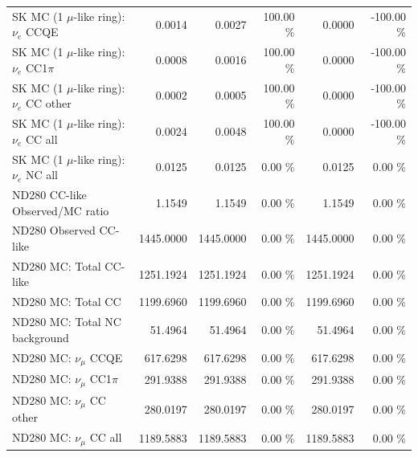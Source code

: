 \begin{table}
\begin{tabular}{| l | r | r  r | r  r |}
                             SK MC (1 $\mu$-like ring): $\nu_{e}$ CCQE &          0.0014 &          0.0027 & 100.00 \%  &          0.0000 & -100.00 \%  \\ 
                         SK MC (1 $\mu$-like ring): $\nu_{e}$ CC1$\pi$ &          0.0008 &          0.0016 & 100.00 \%  &          0.0000 & -100.00 \%  \\ 
                         SK MC (1 $\mu$-like ring): $\nu_{e}$ CC other &          0.0002 &          0.0005 & 100.00 \%  &          0.0000 & -100.00 \%  \\ 
                           SK MC (1 $\mu$-like ring): $\nu_{e}$ CC all &          0.0024 &          0.0048 & 100.00 \%  &          0.0000 & -100.00 \%  \\ 
                           SK MC (1 $\mu$-like ring): $\nu_{e}$ NC all &          0.0125 &          0.0125 &  0.00 \%  &          0.0125 &  0.00 \%  \\ 
\hline
                                       ND280 CC-like Observed/MC ratio &          1.1549 &          1.1549 &  0.00 \%  &          1.1549 &  0.00 \%  \\ 
                                                ND280 Observed CC-like &       1445.0000 &       1445.0000 &  0.00 \%  &       1445.0000 &  0.00 \%  \\ 
                                               ND280 MC: Total CC-like &       1251.1924 &       1251.1924 &  0.00 \%  &       1251.1924 &  0.00 \%  \\ 
                                                    ND280 MC: Total CC &       1199.6960 &       1199.6960 &  0.00 \%  &       1199.6960 &  0.00 \%  \\ 
                                         ND280 MC: Total NC background &         51.4964 &         51.4964 &  0.00 \%  &         51.4964 &  0.00 \%  \\ 
\hline
                                            ND280 MC: $\nu_{\mu}$ CCQE &        617.6298 &        617.6298 &  0.00 \%  &        617.6298 &  0.00 \%  \\ 
                                        ND280 MC: $\nu_{\mu}$ CC1$\pi$ &        291.9388 &        291.9388 &  0.00 \%  &        291.9388 &  0.00 \%  \\ 
                                        ND280 MC: $\nu_{\mu}$ CC other &        280.0197 &        280.0197 &  0.00 \%  &        280.0197 &  0.00 \%  \\ 
                                          ND280 MC: $\nu_{\mu}$ CC all &       1189.5883 &       1189.5883 &  0.00 \%  &       1189.5883 &  0.00 \%  \\ 

\end{tabular}
\end{table}
